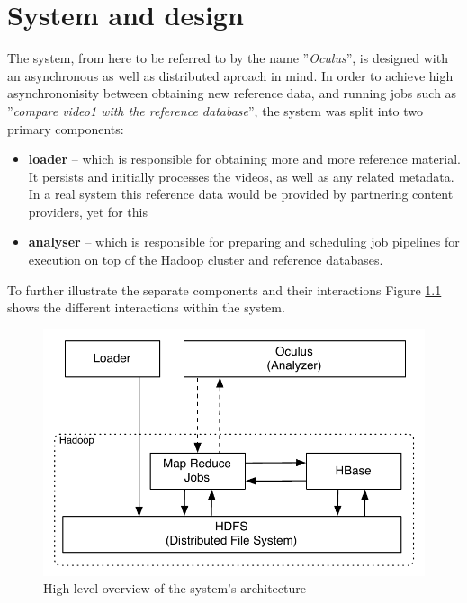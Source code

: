
\chapter{System and design}
\label{chap:system-design}

The system, from here to be referred to by the name ''\textit{Oculus}'', is designed with an asynchronous as well as distributed aproach in mind. In order to achieve high asynchrononisity between obtaining new reference data, and running jobs such as ''\textit{compare video1 with the reference database}'', the system was split into two primary components: 

\begin{itemize}
  \item \textbf{loader} -- which is responsible for obtaining more and more reference material. It persists and initially processes the videos, as well as any related metadata. In a real system this reference data would be provided by partnering content providers, yet for this 
  \item \textbf{analyser} -- which is responsible for preparing and scheduling job pipelines for execution on top of the Hadoop cluster and reference databases.
\end{itemize}

To further illustrate the separate components and their interactions Figure \ref{fig:system-overview} shows the different interactions within the system.

\begin{figure}[hc!]
 \centering
  \includegraphics[scale=0.9]{./diagrams/high-level-system.pdf}
  \caption{High level overview of the system's architecture}
  \label{fig:system-overview}
\end{figure}

